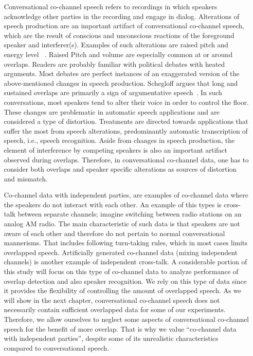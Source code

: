 Conversational co-channel speech refers to recordings in which speakers acknowledge other parties in the recording and engage in dialog. 
Alterations of speech production are an important artifact of conversational co-channel speech, which are the result of conscious and unconscious reactions of the foreground speaker and interferer(s). 
Examples of such alterations are raised pitch and energy level ~\cite{Shriberg01observationson,schegloff2000overlapping}. 
Raised Pitch and volume are especially common at or around overlaps. 
Readers are probably familiar with political debates with heated arguments. 
Most debates are perfect instances of an exaggerated version of the above-mentioned changes in speech production. 
Schegloff argues that long and sustained overlaps are primarily a sign of argumentative speech~\cite{schegloff2000overlapping}. 
In such conversations, most speakers tend to alter their voice in order to control the floor. 
These changes are problematic in automatic speech applications and are considered a type of distortion. 
Treatments are directed towards applications that suffer the most from speech alterations, predominantly automatic transcription of speech, i.e., speech recognition. 
Aside from changes in speech production, the element of interference by competing speakers is also an important artifact observed during overlaps. 
Therefore, in conversational co-channel data, one has to consider both overlaps and speaker specific alterations as sources of distortion and mismatch. 

Co-channel data with independent parties, are examples of co-channel data where the speakers do not interact with each other. 
An example of this types is cross-talk between separate channels; imagine switching between radio stations on an analog AM radio. 
The main characteristic of such data is that speakers are not aware of each other and therefore do not pertain to normal conversational mannerisms. 
That includes following turn-taking rules, which in most cases limits overlapped speech. 
Artificially generated co-channel data (mixing independent channels) is another example of independent cross-talk. 
A considerable portion of this study will focus on this type of co-channel data to analyze performance of overlap detection and also speaker recognition. 
We rely on this type of data since it provides the flexibility of controlling the amount of overlapped speech. 
As we will show in the next chapter, conversational co-channel speech does not necessarily contain sufficient overlapped data for some of our experiments. 
Therefore, we allow ourselves to neglect some aspects of conversational co-channel speech for the benefit of more overlap. 
That is why we value ``co-channel data with independent parties'', despite some of its unrealistic characteristics compared to conversational speech. 


